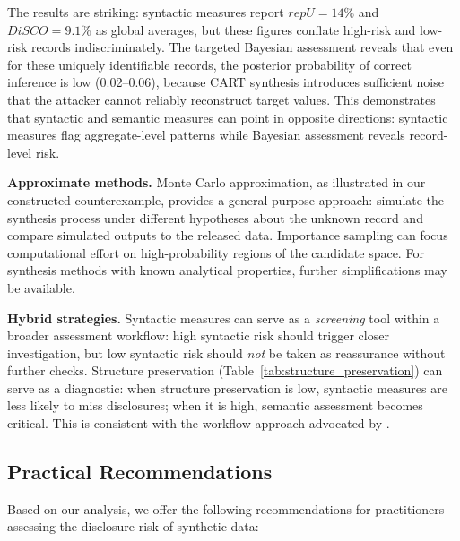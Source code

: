 \documentclass[Afour,sageh,times,doublespace]{sagej}
\begin{document}
% 

The results are striking: syntactic measures report $repU = 14\%$ and $DiSCO = 9.1\%$ as global averages, but these figures conflate high-risk and low-risk records indiscriminately. The targeted Bayesian assessment reveals that even for these uniquely identifiable records, the posterior probability of correct inference is low (0.02--0.06), because CART synthesis introduces sufficient noise that the attacker cannot reliably reconstruct target values. This demonstrates that syntactic and semantic measures can point in opposite directions: syntactic measures flag aggregate-level patterns while Bayesian assessment reveals record-level risk.

\textbf{Approximate methods.} Monte Carlo approximation, as illustrated in our constructed counterexample, provides a general-purpose approach: simulate the synthesis process under different hypotheses about the unknown record and compare simulated outputs to the released data. Importance sampling can focus computational effort on high-probability regions of the candidate space. For synthesis methods with known analytical properties, further simplifications may be available.

\textbf{Hybrid strategies.} Syntactic measures can serve as a \textit{screening} tool within a broader assessment workflow: high syntactic risk should trigger closer investigation, but low syntactic risk should \textit{not} be taken as reassurance without further checks. Structure preservation (Table~\ref{tab:structure_preservation}) can serve as a diagnostic: when structure preservation is low, syntactic measures are less likely to miss disclosures; when it is high, semantic assessment becomes critical. This is consistent with the workflow approach advocated by \citet{Raab2024}.

\subsection{Practical Recommendations}

Based on our analysis, we offer the following recommendations for practitioners assessing the disclosure risk of synthetic data:
\end{document}
